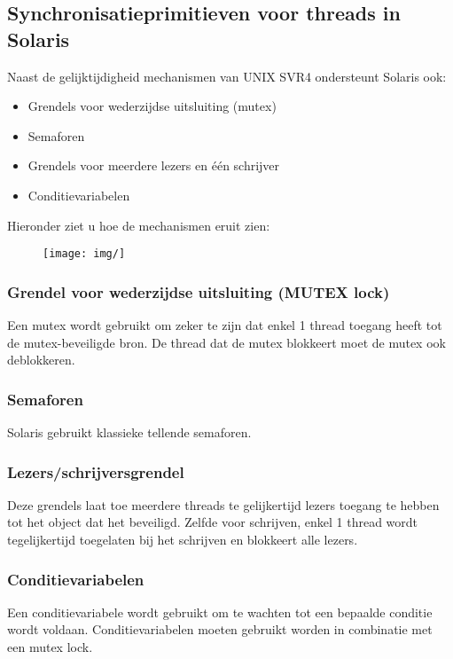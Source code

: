 \subsection{Synchronisatieprimitieven voor threads in Solaris}

Naast de gelijktijdigheid mechanismen van UNIX SVR4 ondersteunt Solaris ook:
\begin{itemize}
\item Grendels voor wederzijdse uitsluiting (mutex)
\item Semaforen
\item Grendels voor meerdere lezers en één schrijver
\item Conditievariabelen
\end{itemize}

Hieronder ziet u hoe de mechanismen eruit zien:

\begin{figure}[htp]
    \centering
            \texttt{[image: img/]}
        \caption{ }
    \label{fig:}
\end{figure}

\subsubsection{Grendel voor wederzijdse uitsluiting (MUTEX lock)}

Een mutex wordt gebruikt om zeker te zijn dat enkel 1 thread toegang heeft tot de mutex-beveiligde bron. De thread dat de mutex blokkeert moet de mutex ook deblokkeren.

\subsubsection{Semaforen}

Solaris gebruikt klassieke tellende semaforen.

\subsubsection{Lezers/schrijversgrendel}

Deze grendels laat toe meerdere threads te gelijkertijd lezers toegang te hebben tot het object dat het beveiligd. Zelfde voor schrijven, enkel 1 thread wordt tegelijkertijd toegelaten bij het schrijven en blokkeert alle lezers.

\subsubsection{Conditievariabelen}

Een conditievariabele wordt gebruikt om te wachten tot een bepaalde conditie wordt voldaan. Conditievariabelen moeten gebruikt worden in combinatie met een mutex lock.
